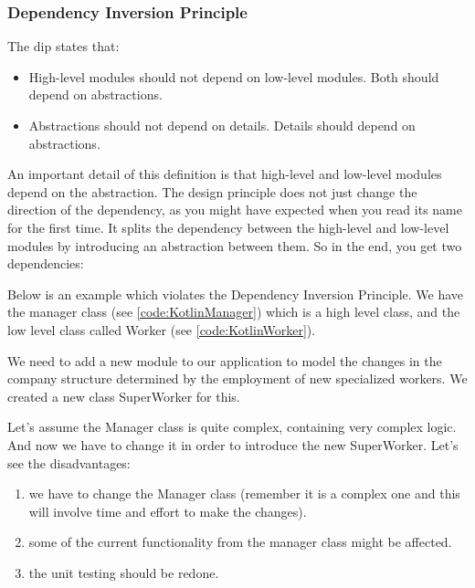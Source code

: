 \subsubsection{Dependency Inversion Principle}
\label{sec:dip}
\begin{framed}
	The \gls{dip} states that:
	\begin{itemize}
		\item High-level modules should not depend on low-level modules.
			Both should depend on abstractions.
		\item Abstractions should not depend on details.
			Details should depend on abstractions.
	\end{itemize}
\end{framed}

An important detail of this definition is that high-level and low-level modules depend on the abstraction.
The design principle does not just change the direction of the dependency, as you might have expected when you read its name for the first time.
It splits the dependency between the high-level and low-level modules by introducing an abstraction between them.
So in the end, you get two dependencies:

Below is an example which violates the Dependency Inversion Principle.
We have the manager class  (see \ref{code:KotlinManager}) which is a high level class, and the low level class called Worker (see \ref{code:KotlinWorker}).





We need to add a new module to our application to model the changes in the company structure determined by the employment of new specialized workers.
We created a new class SuperWorker for this.

Let's assume the Manager class is quite complex, containing very complex logic.
And now we have to change it in order to introduce the new SuperWorker.
Let's see the disadvantages:

\begin{enumerate}
	\item we have to change the Manager class (remember it is a complex one and this will involve time and effort to make the changes).
	\item some of the current functionality from the manager class might be affected.
	\item the unit testing should be redone.
\end{enumerate}

